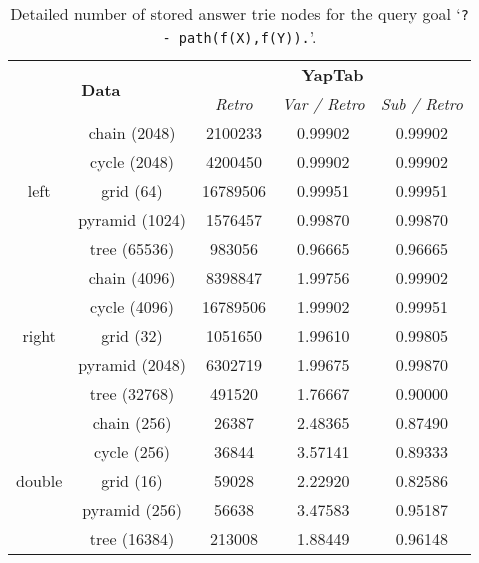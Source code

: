 \begin{table}[ht]
\centering
\small{
  \begin{tabular}{cc|ccc}
   \hline
    \hline
    \multicolumn{2}{c|}{\multirow{2}{*}{\normalsize{\textbf{Data}}}} & \multicolumn{3}{c}{\normalsize{\textbf{YapTab}}} \\
     \multicolumn{2}{c|}{} & \small{\textit{Retro}} & \textit{\small{Var / Retro}} & \textit{\small{Sub / Retro}} \\
   \hline
   \hline
   \multirow{5}{*}{left} &  \footnotesize{chain (2048)} &  2100233 &  0.99902 & 0.99902 \\
   &  \footnotesize{cycle (2048)} &  4200450 &  0.99902 & 0.99902 \\
   &  \footnotesize{grid (64)} &  16789506 &  0.99951 & 0.99951 \\
   &  \footnotesize{pyramid (1024)} &  1576457 &  0.99870 & 0.99870 \\
   &  \footnotesize{tree (65536)} &  983056 &  0.96665 & 0.96665 \\
   \hline
   
   \multirow{5}{*}{right} &  \footnotesize{chain (4096)} &  8398847 &  1.99756 & 0.99902 \\
   &  \footnotesize{cycle (4096)} &  16789506 &  1.99902 & 0.99951 \\
   &  \footnotesize{grid (32)} &  1051650 &  1.99610 & 0.99805 \\
   &  \footnotesize{pyramid (2048)} &  6302719 &  1.99675 & 0.99870 \\
   &  \footnotesize{tree (32768)} &  491520 &  1.76667 & 0.90000 \\
   \hline
   
   \multirow{5}{*}{double} &  \footnotesize{chain (256)} &  26387 &  2.48365 & 0.87490 \\
   &  \footnotesize{cycle (256)} &  36844 &  3.57141 & 0.89333 \\
   &  \footnotesize{grid (16)} &  59028 &  2.22920 & 0.82586 \\
   &  \footnotesize{pyramid (256)} &  56638 &  3.47583 & 0.95187 \\
   &  \footnotesize{tree (16384)} &  213008 &  1.88449 & 0.96148 \\
   \hline
\hline
\end{tabular}
}
\caption{Detailed number of stored answer trie nodes for the query goal `\texttt{?-~path(f(X),f(Y)).}'.}
\label{tbl:results_detail_stst_space}
\end{table}
